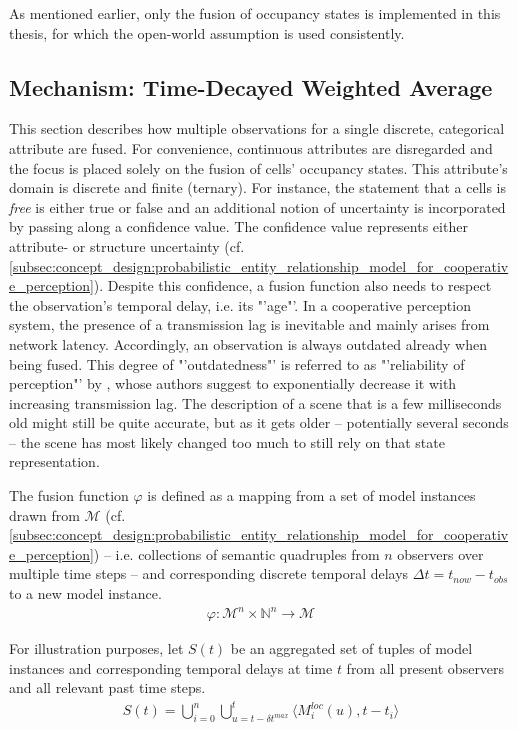 As mentioned earlier, only the fusion of occupancy states is implemented in this thesis, for which the open-world assumption is used consistently.

\subsection{Mechanism: Time-Decayed Weighted Average}
\label{subsec:concept_design:fusion_mechanism}
This section describes how multiple observations for a single discrete, categorical attribute are fused. For convenience, continuous attributes are disregarded and the focus is placed solely on the fusion of cells' occupancy states. This attribute's domain is discrete and finite (ternary). For instance, the statement that a cells is \textit{free} is either true or false and an additional notion of uncertainty is incorporated by passing along a confidence value. The confidence value represents either attribute- or structure uncertainty (cf. \cref{subsec:concept_design:probabilistic_entity_relationship_model_for_cooperative_perception}).
Despite this confidence, a fusion function also needs to respect the observation's temporal delay, i.e. its "'age"'. In a cooperative perception system, the presence of a transmission lag is inevitable and mainly arises from network latency. Accordingly, an observation is always outdated already when being fused. This degree of "'outdatedness"' is referred to as "'reliability of perception"' by \cite{liu2013motion}, whose authors suggest to exponentially decrease it with increasing transmission lag. The description of a scene that is a few milliseconds old might still be quite accurate, but as it gets older – potentially several seconds – the scene has most likely changed too much to still rely on that state representation. 

The fusion function $\varphi$ is defined as a mapping from a set of model instances drawn from $\mathcal{M}$ (cf. \cref{subsec:concept_design:probabilistic_entity_relationship_model_for_cooperative_perception}) – i.e. collections of semantic quadruples from $n$ observers over multiple time steps – and corresponding discrete temporal delays $\Delta t = t_{now} - t_{obs}$ to a new model instance.
\begin{gather}
	\varphi: \mathcal{M}^n \times \mathbb{N}^n \rightarrow \mathcal{M}
\end{gather}

For illustration purposes, let $S(t)$ be an aggregated set of tuples of model instances and corresponding temporal delays at time $t$ from all present observers and all relevant past time steps.
\begin{gather}
	S(t) = \bigcup^n_{i = 0} \bigcup^t_{u = t - \delta t^{max}} \langle M^{loc}_i(u), t-t_i \rangle
	\label{eq:S}
\end{gather}
\par
\medskip

